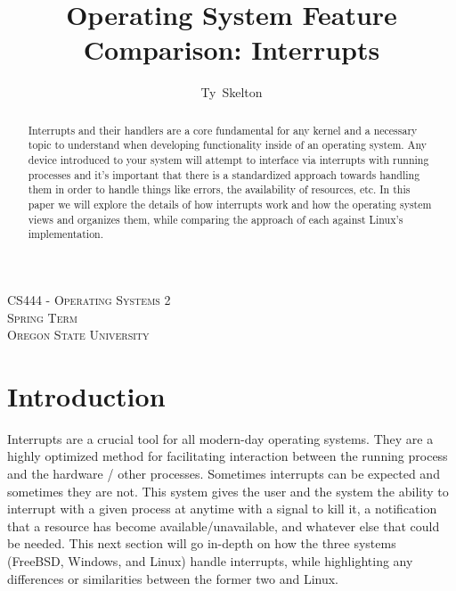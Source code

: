 \documentclass[10pt,draftclsnofoot,onecolumn]{IEEEtran}
\begin{document}
\singlespacing %
\title{Operating System Feature Comparison: Interrupts}

\author{Ty~Skelton}

\maketitle

\begin{abstract}
Interrupts and their handlers are a core fundamental for any kernel and a necessary topic to understand when developing functionality inside of an operating system.
Any device introduced to your system will attempt to interface via interrupts with running processes and it's important that there is a standardized approach towards handling them in order to handle things like errors, the availability of resources, etc.
In this paper we will explore the details of how interrupts work and how the operating system views and organizes them, while comparing the approach of each against Linux's implementation.

\end{abstract}

\begin{center}
\scshape %
CS444 - Operating Systems 2 \\  %
Spring Term\\[\baselineskip]    %
Oregon State University\par     %
\end{center}

\IEEEpeerreviewmaketitle

\newpage
{}
\tableofcontents
\newpage

\section{Introduction}
\label{sec:Introduction}
\par Interrupts are a crucial tool for all modern-day operating systems.
They are a highly optimized method for facilitating interaction between the running process and the hardware / other processes.
Sometimes interrupts can be expected and sometimes they are not.
This system gives the user and the system the ability to interrupt with a given process at anytime with a signal to kill it, a notification that a resource has become available/unavailable, and whatever else that could be needed.
This next section will go in-depth on how the three systems (FreeBSD, Windows, and Linux) handle interrupts, while highlighting any differences or similarities between the former two and Linux.
\end{document}
